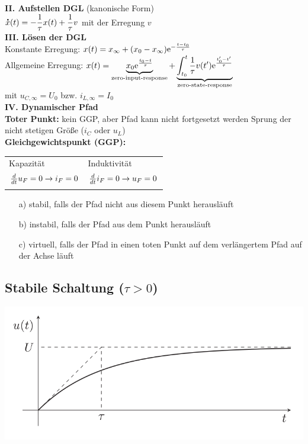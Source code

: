 \documentclass[fs, footer]{latex4ei}
\begin{document}
\begin{multicols*}{4}
{	\textbf{II. Aufstellen DGL} (kanonische Form)\\
	$\accentset{\mbox{\textrm{\large\bfseries .}} }{x}(t) = - \dfrac{1}{\tau}x(t) + \dfrac{1}{\tau}v$ mit der Erregung $v$\\
	\textbf{III. Lösen der DGL}\\
	Konstante Erregung:  $x(t) = x_\infty + (x_0 - x_\infty )\mathrm{e}^{-\frac{t-t_0}{\tau}}$ \\
	Allgemeine Erregung: $x(t) = \underbrace{x_0\mathrm{e}^{\frac{t_0-t}{\tau}}}_{\text{zero-input-response}}+\underbrace{\int_{t_0}^t{\frac{1}{\tau}v(t')\mathrm{e}^{\frac{t'_0-t'}{\tau}}}}_{\text{zero-state-response}}$ \\
	mit $u_{C,\infty}=U_0$ bzw. $i_{L,\infty}=I_0$\\
	\textbf{IV. Dynamischer Pfad}\\
\textbf{Toter Punkt:} kein GGP, aber Pfad kann nicht fortgesetzt werden \ra Sprung der nicht stetigen Größe ($i_C$ oder $u_L$)\\
\textbf{Gleichgewichtspunkt (GGP):}\\
	\begin{tabular*}{\columnwidth}{@{\extracolsep\fill}ll@{}}
		Kapazität & Induktivität\\ \mrule
		$\frac{d}{dt}u_F = 0 \rightarrow i_F = 0$ & $\frac{d}{dt}i_F = 0 \rightarrow u_F = 0$\\
		\mrule	
	\end{tabular*}
\begin{itemize}
	\item[a)] stabil, falls der Pfad nicht aus diesem Punkt herausläuft
	\item[b)] instabil, falls der Pfad aus dem Punkt herausläuft
	\item[c)] virtuell, falls der Pfad in einen toten Punkt auf dem verlängertem Pfad auf der Achse läuft
\end{itemize}
}

\subsection{Stabile Schaltung ($\tau > 0$)}
\includegraphics[width=.8\linewidth]{img/graph-stabil}

\end{multicols*}
\end{document}
